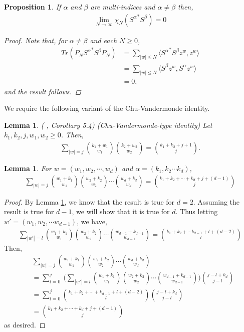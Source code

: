 \documentclass[article]{amsart}
\newtheorem{proposition}        [theorem]{Proposition}
\newtheorem{lemma}[theorem]{Lemma}
\begin{document}
\begin{proposition}
If $\alpha$ and $\beta$ are multi-indices and $\alpha \neq \beta$ then,
\begin{align*}
\lim_{N\rightarrow \infty} \chi_N({S^{\alpha}}^* S^{\beta})= 0
\end{align*}
\begin{proof}
Note that, for $\alpha \neq \beta$ and each $N\geq 0$,
\begin{align*}
Tr(P_N{S^{\alpha}}^* S^{\beta} P_N) &= \sum_{|w|\leq N } \langle {S^{\alpha}}^* S^{\beta}z^w, z^w\rangle\\
&= \sum_{|w|\leq N}\langle S^{\beta}z^w, S^{\alpha}z^w\rangle\\
& = 0,
\end{align*}
and the result follows.
\end{proof}
\end{proposition}
We require the following variant of the Chu-Vandermonde identity.
\begin{lemma}\label{eq16}
( \cite{MR4020393}, Corollary 5.4) (Chu-Vandermonde-type identity) Let $k_1,k_2,j,w_1, w_2 \geq 0$. Then,
\begin{align*}
\sum_{|w|=j} \binom{k_1+w_1}{w_1} \binom{k_2+w_2}{w_2} = \binom{k_1+k_2+j+1}{j}.
\end{align*}
\end{lemma}
\begin{lemma}
For $w=(w_1,w_2,\cdots, w_d)$ and $\alpha=(k_1,k_2\cdots k_d)$,
\begin{align*}
\sum_{|w|=j} \binom{w_1+k_1}{w_1} \binom{w_2+k_2}{w_2} \cdots \binom{w_d+k_d}{w_d} = \binom{k_1+k_2+\cdots +k_d+ j +(d-1)}{j}
\end{align*}
\end{lemma}
\begin{proof}
By Lemma \ref{eq16}, we know that the result is true for $d=2$. Assuming the result is true for $d-1$, we will show that it is true for $d$. Thus letting $w' =(w_1,w_2,\cdots w_{d-1})$, we have,
\begin{align*}
\sum_{|w'|=l} \binom{w_1+k_1}{w_1} \binom{w_2+k_2}{w_2} \cdots \binom{w_{d-1}+k_{d-1}}{w_{d-1}} = \binom{k_1+k_2+\cdots k_{d-1}+ l +(d-2)}{l}
\end{align*}
Then,
\begin{align*}
&\sum_{|w|=j} \binom{w_1+k_1}{w_1} \binom{w_2+k_2}{w_2} \cdots \binom{w_d+k_d}{w_d}\\
&= \sum_{l=0}^j \  \Bigg(\sum_{|w'|=l}\binom{w_1+k_1}{w_1} \binom{w_2+k_2}{w_2} \cdots \binom{w_{d-1}+k_{d-1}}{w_{d-1}} \Bigg) \binom{j-l+k_d}{j-l}\\
 &=\sum_{l=0}^{j} \binom{k_1+k_2+\cdots +k_{d-1}+ l+ (d-2)}{l}\binom{j-l+k_d}{j-l}\\
 & = \binom{k_1+k_2+\cdots + k_d+ j +(d-1)}{j}
\end{align*}
as desired.
\end{proof}
\end{document}
